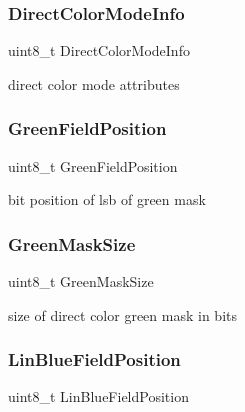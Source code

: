 \subsubsection{\texorpdfstring{Direct\+Color\+Mode\+Info}{DirectColorModeInfo}}
{\footnotesize\ttfamily uint8\+\_\+t Direct\+Color\+Mode\+Info}



direct color mode attributes 

\hypertarget{structvbe__mode__info__t_a602b28f8e5da781eabfd736743a6ea09}{}\label{structvbe__mode__info__t_a602b28f8e5da781eabfd736743a6ea09} 
\subsubsection{\texorpdfstring{Green\+Field\+Position}{GreenFieldPosition}}
{\footnotesize\ttfamily uint8\+\_\+t Green\+Field\+Position}



bit position of lsb of green mask 

\hypertarget{structvbe__mode__info__t_ac7b4df72e505b74493e7d5144cbac743}{}\label{structvbe__mode__info__t_ac7b4df72e505b74493e7d5144cbac743} 
\subsubsection{\texorpdfstring{Green\+Mask\+Size}{GreenMaskSize}}
{\footnotesize\ttfamily uint8\+\_\+t Green\+Mask\+Size}



size of direct color green mask in bits 

\hypertarget{structvbe__mode__info__t_a3f38d6becbe961786cd7ab58ec37fc07}{}\label{structvbe__mode__info__t_a3f38d6becbe961786cd7ab58ec37fc07} 
\subsubsection{\texorpdfstring{Lin\+Blue\+Field\+Position}{LinBlueFieldPosition}}
{\footnotesize\ttfamily uint8\+\_\+t Lin\+Blue\+Field\+Position}



